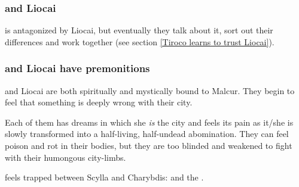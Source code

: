 \begin{garbage}
\subsubsection{\Tiroco{} and Liocai}
\Tiroco{} is antagonized by Liocai, but eventually they talk about it, sort out their differences and work together (see section \ref{Tiroco learns to trust Liocai}).





\subsubsection{\Tiroco{} and Liocai have premonitions}
\Tiroco{} and Liocai are both spiritually and mystically bound to Malcur. They begin to feel that something is deeply wrong with their city. 

Each of them has dreams in which she \emph{is} the city and feels its pain as it/she is slowly transformed into a half-living, half-undead abomination. They can feel poison and rot in their bodies, but they are too blinded and weakened to fight with their humongous city-limbs.

\Tiroco{} feels trapped between Scylla and Charybdis: \Nithdornazsh{} and the \ghobaleth. 

\end{garbage}

